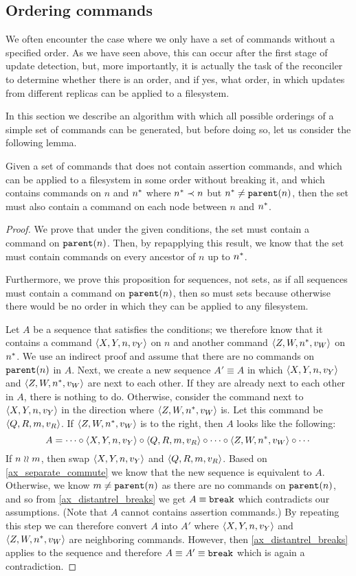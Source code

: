 
\subsection{Ordering commands}\label{ordering}

We often encounter the case where we only have a set of commands without a specified order.
As we have seen above, this can occur after the first stage of update detection,
but, more importantly,
it is actually the task of the reconciler to determine whether there is an order,
and if yes, what order,
in which updates from different replicas can be applied to a filesystem.

In this section we describe an algorithm with which all possible orderings of a
simple set of commands can be generated, but before doing so, let us consider the following lemma.

\begin{mylem}\label{connected_changes}
Given a set of commands that
does not contain assertion commands,
and which can be applied to a filesystem in some order without breaking it,
and which contains commands on $n$ and $n^*$ where $n^*\prec n$
but $n^*\neq\mathtt{parent}(n)$, then the set must also contain a command
on each node between $n$ and $n^*$.
\end{mylem}
\begin{proof}
We prove that under the given conditions, the set must contain a command on $\mathtt{parent}(n)$.
Then, by repapplying this result, we know that the set must contain commands on every
ancestor of $n$ up to $n^*$.

Furthermore,
we prove this proposition for sequences, not sets, as if all sequences must contain a command on $\mathtt{parent}(n)$,
then so must sets because otherwise there would be no order in which they can be
applied to any filesystem.

Let $A$ be a sequence that satisfies the conditions;
we therefore know that it contains a command $\langle{X,Y,n,v_Y}\rangle$ on $n$
and another command $\langle{Z,W,n^*,v_W}\rangle$ on $n^*$.
We use an indirect proof and assume that there are no commands on $\mathtt{parent}(n)$ in $A$.
Next, we create a new sequence $A'\equiv A$ in which $\langle{X,Y,n,v_Y}\rangle$ and $\langle{Z,W,n^*,v_W}\rangle$ are next to each other.
If they are already next to each other in $A$, there is nothing to do.
Otherwise, consider the command next to $\langle{X,Y,n,v_Y}\rangle$ in the direction where $\langle{Z,W,n^*,v_W}\rangle$ is.
Let this command be $\langle{Q,R,m,v_R}\rangle$.
If $\langle{Z,W,n^*,v_W}\rangle$ is to the right, then $A$ looks like the following:
\[ A = \cdots\circ\langle{X,Y,n,v_Y}\rangle\circ\langle{Q,R,m,v_R}\rangle\circ\cdots\circ\langle{Z,W,n^*,v_W}\rangle\circ\cdots \]
If $n\mathrel{\wr\wr} m$, then swap $\langle{X,Y,n,v_Y}\rangle$ and $\langle{Q,R,m,v_R}\rangle$. Based on \cref{ax_separate_commute} we know that the new
sequence is equivalent to $A$.
Otherwise, we know $m\neq\mathtt{parent}(n)$ as there are no commands on $\mathtt{parent}(n)$, and so
from \cref{ax_distantrel_breaks} we get $A\equiv\mathtt{break}$ which contradicts our assumptions.
(Note that $A$ cannot contains assertion commands.)
By repeating this step we can therefore convert $A$ into $A'$ where $\langle{X,Y,n,v_Y}\rangle$ and $\langle{Z,W,n^*,v_W}\rangle$ are neighboring commands.
However, then \cref{ax_distantrel_breaks} applies to the sequence and therefore $A\equiv A'\equiv\mathtt{break}$ which
is again a contradiction.
\end{proof}

